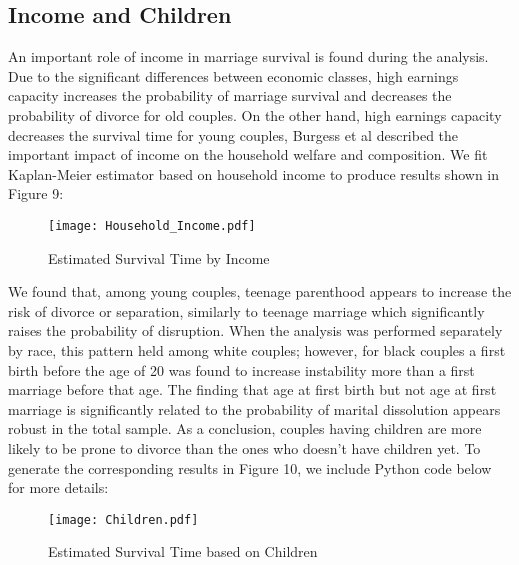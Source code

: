 \documentclass[10pt,twocolumn]{article}
\begin{document}
\subsection{Income and Children}
An important role of income in marriage survival is found during the analysis. Due to the significant differences between economic classes, high earnings capacity increases the probability of marriage survival and decreases the probability of divorce for old couples. On the other hand, high earnings capacity decreases the survival time for young couples, Burgess et al described the important impact of income on the household welfare and composition\cite{burgess2003role}. We fit Kaplan-Meier estimator based on household income to produce results shown in Figure 9:
 
\begin{figure}[!htb]
\centering
\texttt{[image: Household\_Income.pdf]}
\caption{Estimated Survival Time by Income}
\label{Fig:Survival_Household_Income}
\end{figure}
We found that, among young couples, teenage parenthood appears to increase the risk of divorce or separation, similarly to teenage marriage which significantly raises the probability of disruption. When the analysis was performed separately by race, this pattern held among white couples; however, for black couples a first birth before the age of 20 was found to increase instability more than a first marriage before that age. The finding that  age at first birth  but not age at first marriage is significantly related to the probability of marital dissolution appears robust in the total sample. As a conclusion, couples having children are more likely to be prone to divorce than the ones who doesn't have children yet. To generate the corresponding results in Figure 10, we include Python code below for more details:
 
\begin{figure}[!htb]
\centering
\texttt{[image: Children.pdf]}
\caption{Estimated Survival Time based on Children}
\label{Fig:Survival_Household_Children}
\end{figure}
\end{document}
